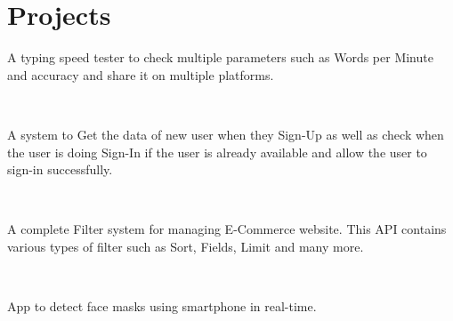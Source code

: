 \documentclass[]{deedy-resume-openfont}
\begin{document}
\begin{minipage}[t]{0.56\textwidth}
\vspace{5pt}
\section{Projects}
 \href{https://satyu26.github.io/Flash-Type/}{}
\begin{tightemize}
\item A typing speed tester to check multiple parameters such as Words per Minute and accuracy and share it on multiple platforms.
\end{tightemize}
\ \ \ \ \ \ 
\sectionsep

 \href{https://github.com/SatYu26/User-Auth-Management-System}{}
\begin{tightemize}
\item A system to Get the data of new user when they Sign-Up as well as check when the user is doing Sign-In if the user is already available and allow the user to sign-in successfully.
\end{tightemize}
\ \ \ \ \ \ 
\sectionsep

\href{https://github.com/SatYu26/StoreAPI}{}
\begin{tightemize}
\item A complete Filter system for managing E-Commerce website. This API contains various types of filter such as Sort, Fields, Limit and many more.
\end{tightemize}
\ \ \ \ \ \ 
\sectionsep

 \href{https://github.com/SatYu26/2021-Solution-Challenge-Submission}{}
\begin{tightemize}
\item App to detect face masks using smartphone in real-time.
\end{tightemize}
\ \ \ \ \ \ 
\sectionsep

%
%

\end{minipage} 
\end{document}
